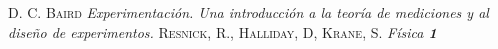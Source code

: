 \begin{thebibliography}{X}
         \textsc{D. C. Baird} 
        \textit{Experimentación. Una introducción a la teoría
        de mediciones y al diseño de experimentos.}
         \textsc{Resnick, R., Halliday, D,
        Krane, S.}
        \textit{Física \textbf{1}}
\end{thebibliography}
